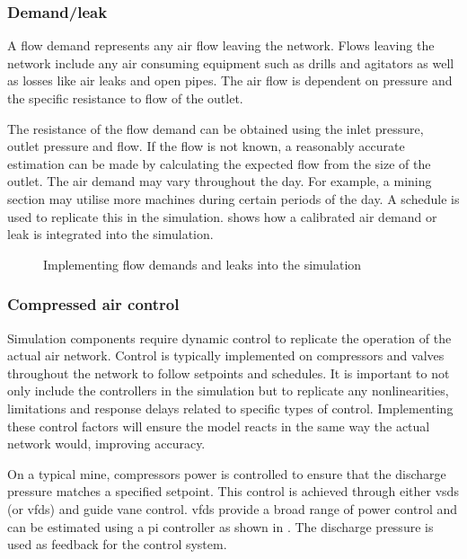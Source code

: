 		\subsubsection{Demand/leak}
			A flow demand represents any air flow leaving the network. Flows leaving the network include any air consuming equipment such as drills and agitators as well as losses like air leaks and open pipes. The air flow is dependent on pressure and the specific resistance to flow of the outlet. 
			\par 
			The resistance of the flow demand can be obtained using the inlet pressure, outlet pressure and flow. If the flow is not known, a reasonably accurate estimation can be made by calculating the expected flow from the size of the outlet. The air demand may vary throughout the day. For example, a mining section may utilise more machines during certain periods of the day. A schedule is used to replicate this in the simulation.  shows how a calibrated air demand or leak is integrated into the simulation.
			\begin{figure}[h]
				\centering
				\caption{Implementing flow demands and leaks into the simulation} 
				\label{fig: Demand component}
			\end{figure}
		\subsubsection{Compressed air control}\label{Controllers}
			Simulation components require dynamic control to replicate the operation of the actual air network. Control is typically implemented on compressors and valves throughout the network to follow setpoints and schedules. It is important to not only include the controllers in the simulation but to replicate any nonlinearities, limitations and response delays related to specific types of control. Implementing these control factors will ensure the model reacts in the same way the actual network would, improving accuracy.
			\par 
			On a typical mine, compressors power is controlled to ensure that the discharge pressure matches a specified setpoint. This control is achieved through either \glspl{vsd} (or \glspl{vfd}) and guide vane control. \glspl{vfd} provide a broad range of power control and can be estimated using a \gls{pi} controller as shown in . The discharge pressure is used as feedback for the control system. 
			
